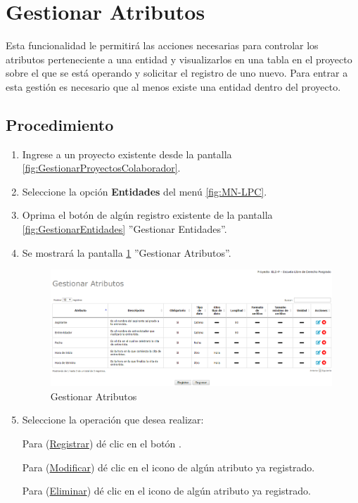 \hypertarget{cv:gestionarAtributos}{\section{Gestionar Atributos}} \label{sec:GestionarAtributos}

	Esta funcionalidad le permitirá las acciones necesarias para controlar los atributos perteneciente a una entidad y visualizarlos en una tabla en el proyecto sobre el que se está operando y solicitar el registro de uno nuevo. Para entrar a esta gestión es necesario que al menos existe una entidad dentro del proyecto.

		\subsection{Procedimiento}

			\begin{enumerate}
				
			\item Ingrese a un proyecto existente desde la pantalla \ref{fig:GestionarProyectosColaborador}.
	
			\item Seleccione la opción \textbf{Entidades} del menú \ref{fig:MN-LPC}.
			
			\item Oprima el botón \IUAtributos{} de algún registro existente de la pantalla \ref{fig:GestionarEntidades} ''Gestionar Entidades''.
	
			\item Se mostrará la pantalla \ref{fig:GestionarAtributos} ''Gestionar Atributos''.

			\begin{figure}[h!]
				\begin{center}
					\includegraphics[scale=0.5]{roles/lider/entidades/atributos/pantallas/IU12-1-1-1gestionarAtributos}
					\caption{Gestionar Atributos}
					\label{fig:GestionarAtributos}
				\end{center}
			\end{figure}
		
				\item Seleccione la operación que desea realizar:
			
			Para (\hyperlink{cv:registrarAtributo}{Registrar}) dé clic en el botón \IURegistrar.
			
			Para (\hyperlink{cv:modificarAtributo}{Modificar}) dé clic en el icono \IUEditar{} de algún atributo ya registrado.
			
			Para (\hyperlink{cv:eliminarAtributo}{Eliminar}) dé clic en el icono \IUBotonEliminar{} de algún atributo ya registrado.
			\end{enumerate}